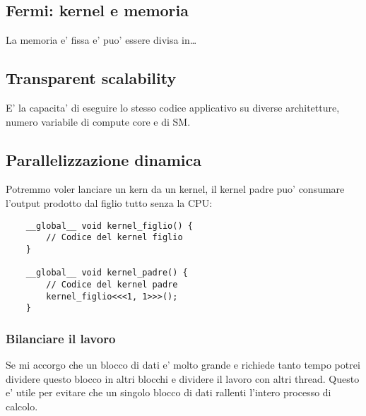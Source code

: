 \subsection{Fermi: kernel e memoria}
La memoria e' fissa e' puo' essere divisa in\dots

\subsection{Transparent scalability}
E' la capacita' di eseguire lo stesso codice applicativo su diverse architetture, numero variabile di compute core e di SM.

\subsection{Parallelizzazione dinamica}
Potremmo voler lanciare un kern da un kernel, il kernel padre puo' consumare l'output prodotto dal figlio tutto senza la CPU:
\begin{lstlisting}
    __global__ void kernel_figlio() {
        // Codice del kernel figlio
    }

    __global__ void kernel_padre() {
        // Codice del kernel padre
        kernel_figlio<<<1, 1>>>();
    }
\end{lstlisting}

\subsubsection{Bilanciare il lavoro}
Se mi accorgo che un blocco di dati e' molto grande e richiede tanto tempo potrei dividere questo blocco in altri blocchi e dividere il lavoro con altri thread. Questo e' utile per evitare che un singolo blocco di dati rallenti l'intero processo di calcolo.